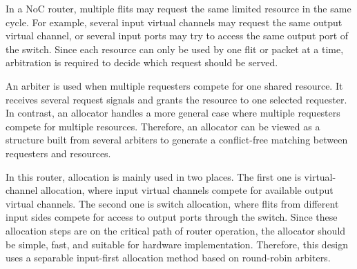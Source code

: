 In a NoC router, multiple flits may request the same limited resource in the same cycle. For example, several input virtual channels may request the same output virtual channel, or several input ports may try to access the same output port of the switch. Since each resource can only be used by one flit or packet at a time, arbitration is required to decide which request should be served.

An arbiter is used when multiple requesters compete for one shared resource. It receives several request signals and grants the resource to one selected requester. In contrast, an allocator handles a more general case where multiple requesters compete for multiple resources. Therefore, an allocator can be viewed as a structure built from several arbiters to generate a conflict-free matching between requesters and resources.

In this router, allocation is mainly used in two places. The first one is virtual-channel allocation, where input virtual channels compete for available output virtual channels. The second one is switch allocation, where flits from different input sides compete for access to output ports through the switch. Since these allocation steps are on the critical path of router operation, the allocator should be simple, fast, and suitable for hardware implementation. Therefore, this design uses a separable input-first allocation method based on round-robin arbiters.
